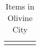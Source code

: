\begin{longtable}{|| l l l l ||}%
\hline%
\endhead%
\hline%
\caption{Items in Olivine City}%
\label{tab:OlivineCityItems}%
\end{longtable}